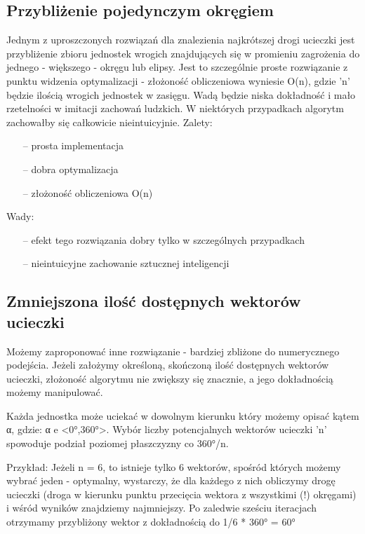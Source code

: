 \documentclass[12pt]{report}
\begin{document}
\subsection{Przybliżenie pojedynczym okręgiem}
Jednym z uproszczonych rozwiązań dla znalezienia najkrótszej drogi ucieczki jest przybliżenie zbioru jednostek wrogich znajdujących się w promieniu zagrożenia do jednego - większego - okręgu lub elipsy. Jest to szczególnie proste rozwiązanie z punktu widzenia optymalizacji - złożoność obliczeniowa wyniesie O(n), gdzie 'n' będzie ilością wrogich jednostek w zasięgu. Wadą będzie niska dokładność i mało rzetelności w imitacji zachowań ludzkich. W niektórych przypadkach algorytm zachowałby się całkowicie nieintuicyjnie.
Zalety:
\begin{itemize}
\item[--] prosta implementacja
\item[--] dobra optymalizacja
\item[--] złożoność obliczeniowa O(n) 
\end{itemize}
Wady:
\begin{itemize}
\item[--] efekt tego rozwiązania dobry tylko w szczególnych przypadkach
\item[--] nieintuicyjne zachowanie sztucznej inteligencji
\end{itemize}

\subsection{Zmniejszona ilość dostępnych wektorów ucieczki}
Możemy zaproponować inne rozwiązanie - bardziej zbliżone do numerycznego podejścia. Jeżeli założymy określoną, skończoną ilość dostępnych wektorów ucieczki, złożoność algorytmu nie zwiększy się znacznie, a jego dokładnością możemy manipulować. 

Każda jednostka może uciekać w dowolnym kierunku który możemy opisać kątem α, gdzie:
α e <0°,360°>.
Wybór liczby potencjalnych wektorów ucieczki 'n' spowoduje podział poziomej płaszczyzny co 360°/n.

Przykład:
Jeżeli n = 6, to istnieje tylko 6 wektorów, spośród których możemy wybrać jeden - optymalny, wystarczy, że dla każdego z nich obliczymy drogę ucieczki (droga w kierunku punktu przecięcia wektora z wszystkimi (!) okręgami) i wśród wyników znajdziemy najmniejszy. Po zaledwie sześciu iteracjach otrzymamy przybliżony wektor z dokładnością do 1/6 * 360° = 60°
\end{document}
